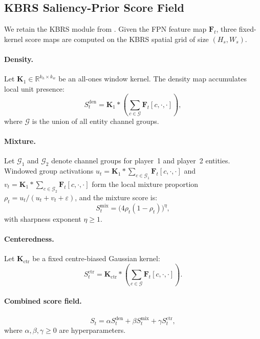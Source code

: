 \documentclass[preprint,12pt]{elsarticle}
\begin{document}
\subsection{KBRS Saliency-Prior Score Field}

We retain the KBRS module from \cite{anonymous2025kbrs}. Given the FPN 
feature map $\mathbf{F}_t$, three fixed-kernel score maps are computed on the 
KBRS spatial grid of size $(H_s, W_s)$.

\paragraph{Density.} Let $\mathbf{K}_1 \in \mathbb{R}^{k_h \times k_w}$ be 
an all-ones window kernel. The density map accumulates local unit presence:
\begin{equation}
  S^{\text{den}}_t = \mathbf{K}_1 * 
    \!\left(\sum_{c \in \mathcal{G}} \mathbf{F}_t[c, \cdot, \cdot]\right),
  \label{eq:density}
\end{equation}
where $\mathcal{G}$ is the union of all entity channel groups.

\paragraph{Mixture.} Let $\mathcal{G}_1$ and $\mathcal{G}_2$ denote channel 
groups for player~1 and player~2 entities. Windowed group activations 
$u_t = \mathbf{K}_1 * \sum_{c \in \mathcal{G}_1}\mathbf{F}_t[c,\cdot,\cdot]$ 
and $v_t = \mathbf{K}_1 * \sum_{c \in \mathcal{G}_2}\mathbf{F}_t[c,\cdot,\cdot]$ 
form the local mixture proportion $\rho_t = u_t / (u_t + v_t + \varepsilon)$, 
and the mixture score is:
\begin{equation}
  S^{\text{mix}}_t = \bigl(4\rho_t(1-\rho_t)\bigr)^{\eta},
  \label{eq:mixture}
\end{equation}
with sharpness exponent $\eta \ge 1$.

\paragraph{Centeredness.} Let $\mathbf{K}_{\text{ctr}}$ be a fixed 
centre-biased Gaussian kernel:
\begin{equation}
  S^{\text{ctr}}_t = \mathbf{K}_{\text{ctr}} *
    \!\left(\sum_{c \in \mathcal{G}} \mathbf{F}_t[c, \cdot, \cdot]\right).
  \label{eq:centeredness}
\end{equation}

\paragraph{Combined score field.}
\begin{equation}
  S_t = \alpha S^{\text{den}}_t + \beta S^{\text{mix}}_t 
             + \gamma S^{\text{ctr}}_t,
  \label{eq:kbrs_combined}
\end{equation}
where $\alpha, \beta, \gamma \ge 0$ are hyperparameters.
\end{document}
